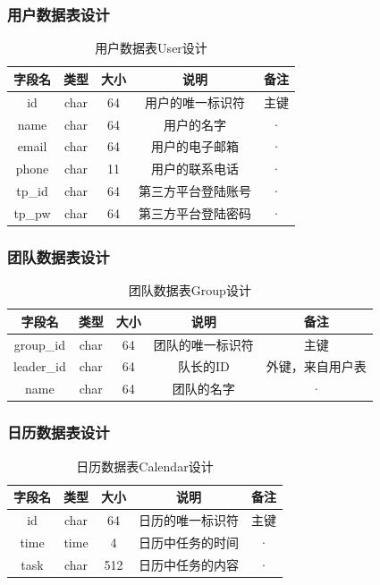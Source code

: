 \subsubsection{\color{red} 用户数据表设计}
\begin{table}[htbp]
\centering
{\color {red}
\caption{\color{red} 用户数据表User设计} \label{tab:client-database}
\begin{tabular}{|c|c|c|c|c|}
    \hline
    字段名 & 类型 & 大小 & 说明 & 备注 \\
    \hline
    id & char & 64 & 用户的唯一标识符 & 主键\\
    \hline
    name & char & 64 & 用户的名字 & · \\
    \hline
    email & char  & 64 & 用户的电子邮箱 & · \\
    \hline
    phone & char & 11 & 用户的联系电话 & · \\
    \hline
    tp\_id & char  & 64 & 第三方平台登陆账号 & · \\
    \hline
    tp\_pw & char & 64 & 第三方平台登陆密码 & · \\
    \hline
\end{tabular}
}
\end{table}
\newpage
\subsubsection{团队数据表设计}
\begin{table}[htbp]
\centering
\caption{团队数据表Group设计} \label{tab:order-database}
\begin{tabular}{|c|c|c|c|c|}
    \hline
    字段名 & 类型 & 大小 & 说明 & 备注 \\
    \hline
    group\_id & char & 64 & 团队的唯一标识符 & 主键\\
    \hline
    leader\_id & char & 64 & 队长的ID & 外键，来自用户表 \\
    \hline
    name & char & 64 & 团队的名字 & · \\
    \hline
\end{tabular}
\end{table}
\newpage
\subsubsection{日历数据表设计}
\begin{table}[htbp]
\centering
\caption{日历数据表Calendar设计} \label{tab:order-database}
\begin{tabular}{|c|c|c|c|c|}
    \hline
    字段名 & 类型 & 大小 & 说明 & 备注 \\
    \hline
    id & char & 64 & 日历的唯一标识符 & 主键\\
    \hline
    time & time & 4 & 日历中任务的时间 & · \\
    \hline
    task & char & 512 & 日历中任务的内容 & · \\
    \hline
\end{tabular}
\end{table}
